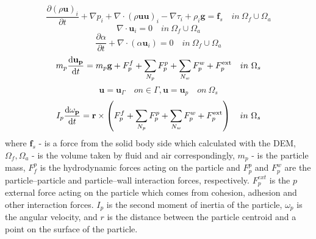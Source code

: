 \begin{equation}
    \frac{\partial (\rho \mathbf{u})_i}{\partial t} + \nabla p_i  +  \nabla \cdot(\rho \mathbf{u}\mathbf{u})_i - \nabla \tau_i + \rho_i \mathbf{g} = \mathbf{f}_{s} \quad in ~\Omega_f \cup \Omega_a
\end{equation}
\begin{equation}
    \nabla\cdot \mathbf{u}_i = 0 \quad in ~\Omega_f \cup \Omega_a
\end{equation}
\begin{equation}
    \frac{\partial \alpha}{\partial t} + \nabla\cdot(\alpha\mathbf{u}_i) = 0 \quad in ~\Omega_f \cup \Omega_a
\end{equation}
\begin{equation}
    m_{p} \frac{\mathrm{d} \mathbf{u}_{\mathbf{p}}}{\mathrm{d} t}=m_{p} \mathbf{g}+F_{p}^{f}+\sum_{N_{p}} F_{p}^{p}+\sum_{N_{w}} F_{p}^{w}+F_{p}^{\mathrm{ext}} \\ \quad in ~\Omega_s
\end{equation}
\begin{equation}
    \mathbf{u} = \mathbf{u}_{\Gamma} \quad on \in \Gamma, \mathbf{u} = \mathbf{u}_p \quad on ~\Omega_s
\end{equation}
\begin{equation}
I_{p} \frac{\mathrm{d} \omega_{\mathbf{p}}}{\mathrm{d} t}=\mathbf{r} \times\left(F_{p}^{f}+\sum_{N_{p}} F_{p}^{p}+\sum_{N_{w}} F_{p}^{w}+F_{p}^{\mathrm{ext}}\right)\\ \quad in ~\Omega_s
\end{equation}
where  $\mathbf{f}_{s}$ - is a force from the solid body side which calculated with the DEM, $\Omega_f,\Omega_a$ -  is the volume taken by fluid and air correspondingly, $m_p$ - is the particle mass, $F^p_f$ is the hydrodynamic forces acting on the particle and $F^p_p$ and $F^w_p$ are the particle–particle and particle–wall interaction forces, respectively. $F^{ext}_p$ is the $p$ external force acting on the particle which comes from cohesion, adhesion and other interaction forces. $I_p$ is the second moment of inertia of the particle, ${\omega}_p$ is the angular velocity, and $r$ is the distance between the particle centroid and a point on the surface of the particle. 

